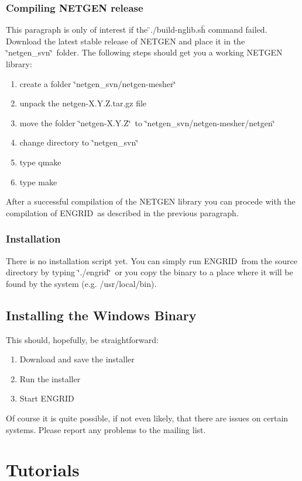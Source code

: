 \documentclass[10pt,a4paper,british]{book}
\newcommand\eg{ENGRID\ }
\newcommand\sqt{\char`\"{}}
\newcommand\eqt{\char`\"{}\ }
\begin{document}
\subsubsection{Compiling NETGEN release}
This paragraph is only of interest if the \"{}./build-nglib.sh\"{} command failed.
Download the latest stable release of NETGEN and place it in the \sqt netgen\_svn\eqt folder. The following steps should get you a working NETGEN library:
\begin{enumerate}
\item create a folder \sqt netgen\_svn/netgen-mesher\eqt
\item unpack the netgen-X.Y.Z.tar.gz file
\item move the folder \sqt netgen-X.Y.Z\eqt to \sqt netgen\_svn/netgen-mesher/netgen\eqt
\item change directory to \sqt netgen\_svn\eqt
\item type qmake 
\item type make
\end{enumerate}
After a successful compilation of the NETGEN library you can procede with the compilation of \eg as described in the previous paragraph.

\subsubsection{Installation}
There is no installation script yet. You can simply run \eg from the source directory by typing \sqt ./engrid\eqt or you copy the binary to a place where it will be found by the system (e.g. /usr/local/bin).

\subsection{Installing the Windows Binary}

This should, hopefully, be straightforward:
\begin{enumerate}
\item Download and save the installer 
\item Run the installer 
\item Start \eg
\end{enumerate}
Of course it is quite possible, if not even likely, that there are issues on certain systems. Please report any problems to the mailing list.

\clearpage

\section{Tutorials}
\end{document}
